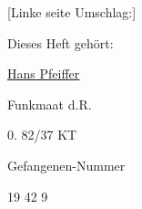 \begin{center}

{\color{red} [Linke seite Umschlag:] }


Dieses Heft geh\"{o}rt:


\ul{\ul{Hans Pfeiffer}}


Funkmaat d.R.


0. 82/37 KT


Gefangenen-Nummer


19 42  9
\end{center}
\clearpage

